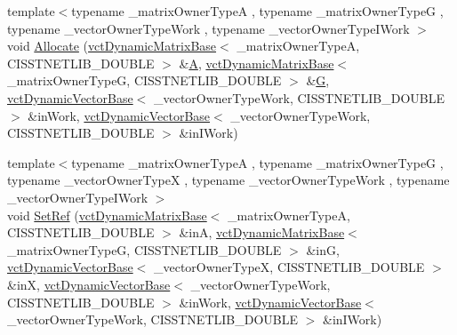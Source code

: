 \begin{DoxyCompactItemize}
\item 
{\footnotesize template$<$typename \+\_\+matrix\+Owner\+Type\+A , typename \+\_\+matrix\+Owner\+Type\+G , typename \+\_\+vector\+Owner\+Type\+Work , typename \+\_\+vector\+Owner\+Type\+I\+Work $>$ }\\void \hyperlink{classnmr_l_sq_lin_solution_dynamic_a292665b5ef73075f7679ebc890e7b09d}{Allocate} (\hyperlink{classvct_dynamic_matrix_base}{vct\+Dynamic\+Matrix\+Base}$<$ \+\_\+matrix\+Owner\+Type\+A, C\+I\+S\+S\+T\+N\+E\+T\+L\+I\+B\+\_\+\+D\+O\+U\+B\+L\+E $>$ \&\hyperlink{classnmr_l_sq_lin_solution_dynamic_aa4a41abac141e2e55dd5cafb59169dfd}{A}, \hyperlink{classvct_dynamic_matrix_base}{vct\+Dynamic\+Matrix\+Base}$<$ \+\_\+matrix\+Owner\+Type\+G, C\+I\+S\+S\+T\+N\+E\+T\+L\+I\+B\+\_\+\+D\+O\+U\+B\+L\+E $>$ \&\hyperlink{classnmr_l_sq_lin_solution_dynamic_a399cb314fb848d36f58c14830bad0c28}{G}, \hyperlink{classvct_dynamic_vector_base}{vct\+Dynamic\+Vector\+Base}$<$ \+\_\+vector\+Owner\+Type\+Work, C\+I\+S\+S\+T\+N\+E\+T\+L\+I\+B\+\_\+\+D\+O\+U\+B\+L\+E $>$ \&in\+Work, \hyperlink{classvct_dynamic_vector_base}{vct\+Dynamic\+Vector\+Base}$<$ \+\_\+vector\+Owner\+Type\+Work, C\+I\+S\+S\+T\+N\+E\+T\+L\+I\+B\+\_\+\+D\+O\+U\+B\+L\+E $>$ \&in\+I\+Work)
\item 
{\footnotesize template$<$typename \+\_\+matrix\+Owner\+Type\+A , typename \+\_\+matrix\+Owner\+Type\+G , typename \+\_\+vector\+Owner\+Type\+X , typename \+\_\+vector\+Owner\+Type\+Work , typename \+\_\+vector\+Owner\+Type\+I\+Work $>$ }\\void \hyperlink{classnmr_l_sq_lin_solution_dynamic_aa5a0eaab043339d1aa2fdaebbffd8cfa}{Set\+Ref} (\hyperlink{classvct_dynamic_matrix_base}{vct\+Dynamic\+Matrix\+Base}$<$ \+\_\+matrix\+Owner\+Type\+A, C\+I\+S\+S\+T\+N\+E\+T\+L\+I\+B\+\_\+\+D\+O\+U\+B\+L\+E $>$ \&in\+A, \hyperlink{classvct_dynamic_matrix_base}{vct\+Dynamic\+Matrix\+Base}$<$ \+\_\+matrix\+Owner\+Type\+G, C\+I\+S\+S\+T\+N\+E\+T\+L\+I\+B\+\_\+\+D\+O\+U\+B\+L\+E $>$ \&in\+G, \hyperlink{classvct_dynamic_vector_base}{vct\+Dynamic\+Vector\+Base}$<$ \+\_\+vector\+Owner\+Type\+X, C\+I\+S\+S\+T\+N\+E\+T\+L\+I\+B\+\_\+\+D\+O\+U\+B\+L\+E $>$ \&in\+X, \hyperlink{classvct_dynamic_vector_base}{vct\+Dynamic\+Vector\+Base}$<$ \+\_\+vector\+Owner\+Type\+Work, C\+I\+S\+S\+T\+N\+E\+T\+L\+I\+B\+\_\+\+D\+O\+U\+B\+L\+E $>$ \&in\+Work, \hyperlink{classvct_dynamic_vector_base}{vct\+Dynamic\+Vector\+Base}$<$ \+\_\+vector\+Owner\+Type\+Work, C\+I\+S\+S\+T\+N\+E\+T\+L\+I\+B\+\_\+\+D\+O\+U\+B\+L\+E $>$ \&in\+I\+Work)
\item 

\end{DoxyCompactItemize}
